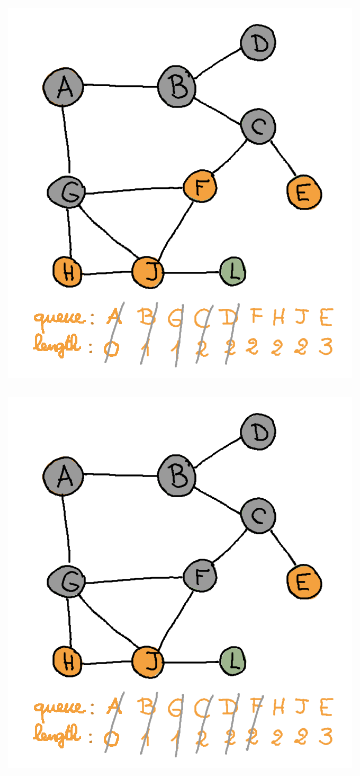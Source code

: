 \begin{enumerate}[(a)]
\begin{figure}[H]
\begin{subfigure}[h]{0.45\textwidth}
    \end{subfigure}
    \vspace{5mm}
    \qquad
    \begin{subfigure}[h]{0.45\textwidth}
    \raggedleft
    \includegraphics[width=\textwidth]{Pictures/SP/panda_gebissen_5.png}
    \end{subfigure}
    \vspace{5mm}
    \centering
    \begin{subfigure}[h]{0.45\textwidth}
    \raggedright
    \includegraphics[width=\textwidth]{Pictures/SP/panda_gebissen_6.png}

\end{subfigure}
\end{figure}
\end{enumerate}
